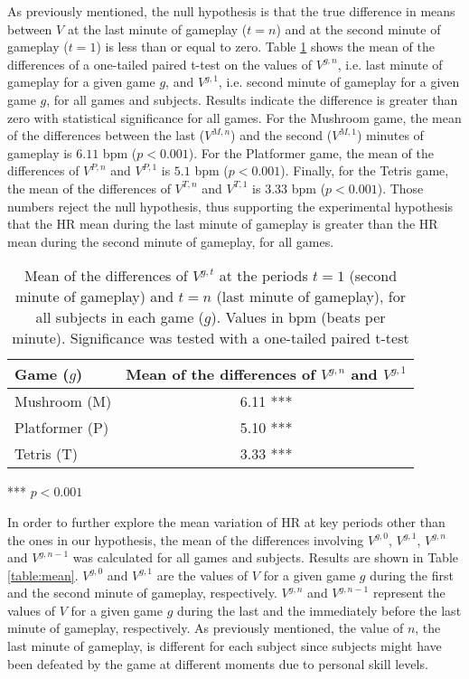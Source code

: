 As previously mentioned, the null hypothesis is that the true difference in means between $V$ at the last minute of gameplay ($t=n$) and at the second minute of gameplay ($t=1$) is less than or equal to zero. Table \ref{table:proof} shows the mean of the differences of a one-tailed paired t-test on the values of $V^{g,n}$, i.e. last minute of gameplay for a given game $g$, and $V^{g,1}$, i.e. second minute of gameplay for a given game $g$, for all games and subjects. Results indicate the difference is greater than zero with statistical significance for all games. For the Mushroom game, the mean of the differences between the last ($V^{M,n}$) and the second ($V^{M,1}$) minutes of gameplay is $6.11$ bpm ($p < 0.001$). For the Platformer game, the mean of the differences of $V^{P,n}$ and $V^{P,1}$ is $5.1$ bpm ($p < 0.001$). Finally, for the Tetris game, the mean of the differences of $V^{T,n}$ and $V^{T,1}$ is $3.33$ bpm ($p < 0.001$). Those numbers reject the null hypothesis, thus supporting the experimental hypothesis that the HR mean during the last minute of gameplay is greater than the HR mean during the second minute of gameplay, for all games.

\begin{table}
    \caption{Mean of the differences of $V^{g,t}$ at the periods $t=1$ (second minute of gameplay) and $t=n$ (last minute of gameplay), for all subjects in each game ($g$). Values in bpm (beats per minute). Significance was tested with a one-tailed paired t-test}
    \label{table:proof}
    \centering
  \begin{threeparttable}
     \begin{tabular}{lc}
        \toprule%
        \textbf{Game ($g$)} & \textbf{Mean of the differences of $V^{g,n}$ and $V^{g,1}$} \\
        \toprule%
        Mushroom (M) & 6.11 ***  \\
        \midrule%
        Platformer (P) & 5.10 ***  \\
        \midrule%
        Tetris (T) & 3.33 *** \\
        \bottomrule%
     \end{tabular}
    \begin{tablenotes}
      \small
      \item[***]{$p < 0.001$}
    \end{tablenotes}
  \end{threeparttable}
\end{table}

In order to further explore the mean variation of HR at key periods other than the ones in our hypothesis, the mean of the differences involving $V^{g,0}$, $V^{g,1}$, $V^{g,n}$ and $V^{g,n-1}$ was calculated for all games and subjects. Results are shown in Table \ref{table:mean}. $V^{g,0}$ and $V^{g,1}$ are the values of $V$ for a given game $g$ during the first and the second minute of gameplay, respectively. $V^{g,n}$ and $V^{g,n-1}$ represent the values of $V$ for a given game $g$ during the last and the immediately before the last minute of gameplay, respectively. As previously mentioned, the value of $n$, the last minute of gameplay, is different for each subject since subjects might have been defeated by the game at different moments due to personal skill levels.

